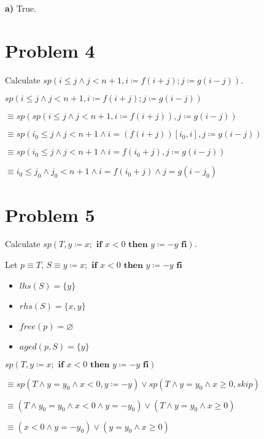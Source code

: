 \documentclass{article}
\begin{document}
\textbf{a)} True.


\section*{Problem 4}

Calculate $ sp(i \leq j \wedge j<n+1, i \coloneqq f(i+j);j \coloneqq g(i-j)) $.
\vspace{10pt}

$ sp(i \leq j \wedge j<n+1, i \coloneqq f(i+j);j \coloneqq g(i-j)) $

\qquad \qquad \qquad  $ \equiv sp(sp(i \leq j \wedge j<n+1, i \coloneqq f(i+j)),j \coloneqq g(i-j)) $

\qquad \qquad \qquad  $ \equiv sp(i_0 \leq j \wedge j<n+1 \wedge i=(f(i+j))[i_0,i],j \coloneqq g(i-j)) $

\qquad \qquad \qquad  $ \equiv sp(i_0 \leq j \wedge j<n+1 \wedge i=f(i_0+j),j \coloneqq g(i-j)) $

\qquad \qquad \qquad  $ \equiv i_0 \leq j_0 \wedge j_0<n+1 \wedge i=f(i_0+j) \wedge j=g(i-j_0) $


\section*{Problem 5}

Calculate $ sp(T, y \coloneqq x; \textbf{ if } x<0 \textbf{ then } y \coloneqq -y \textbf{ fi}) $.
\vspace{10pt}

Let $p \equiv T$, $ S \equiv y \coloneqq x; \textbf{ if } x<0 \textbf{ then } y \coloneqq -y \textbf{ fi} $

\begin{itemize}
\item $lhs(S)=\{y\}$
\item $rhs(S)=\{x,y\}$
\item $free(p)=\varnothing$
\item $aged(p,S)=\{y\}$
\end{itemize}

$ sp(T, y \coloneqq x; \textbf{ if } x<0 \textbf{ then } y \coloneqq -y \textbf{ fi}) $

\qquad \qquad \qquad  $ \equiv sp(T \wedge y=y_0 \wedge x<0, y \coloneqq -y) \vee sp (T \wedge y=y_0 \wedge x \geq 0, skip) $

\qquad \qquad \qquad  $ \equiv (T \wedge y_0=y_0 \wedge x<0 \wedge y = -y_0) \vee (T \wedge y=y_0 \wedge x \geq 0) $

\qquad \qquad \qquad  $ \equiv (x<0 \wedge y = -y_0) \vee (y=y_0 \wedge x \geq 0) $
\end{document}
